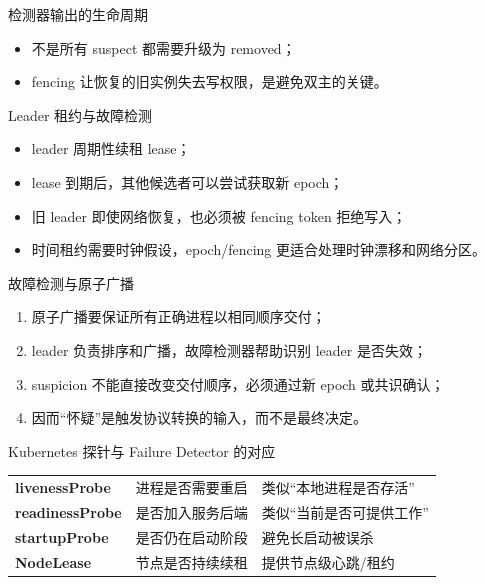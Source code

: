 \documentclass[UTF8,fontset=none,aspectratio=169,10pt]{beamer}
\begin{document}
\begin{frame}{检测器输出的生命周期}
\begin{center}
\end{center}
\begin{itemize}
  \item 不是所有 suspect 都需要升级为 removed；
  \item fencing 让恢复的旧实例失去写权限，是避免双主的关键。
\end{itemize}
\end{frame}

\begin{frame}{Leader 租约与故障检测}
\begin{itemize}
  \item leader 周期性续租 lease；
  \item lease 到期后，其他候选者可以尝试获取新 epoch；
  \item 旧 leader 即使网络恢复，也必须被 fencing token 拒绝写入；
  \item 时间租约需要时钟假设，epoch/fencing 更适合处理时钟漂移和网络分区。
\end{itemize}
\end{frame}

\begin{frame}{故障检测与原子广播}
\begin{enumerate}
  \item 原子广播要保证所有正确进程以相同顺序交付；
  \item leader 负责排序和广播，故障检测器帮助识别 leader 是否失效；
  \item suspicion 不能直接改变交付顺序，必须通过新 epoch 或共识确认；
  \item 因而“怀疑”是触发协议转换的输入，而不是最终决定。
\end{enumerate}
\end{frame}

\begin{frame}{Kubernetes 探针与 Failure Detector 的对应}
\begin{tabularx}{\linewidth}{>{\bfseries}p{3cm}XX}
\toprule
livenessProbe & 进程是否需要重启 & 类似“本地进程是否存活” \\
readinessProbe & 是否加入服务后端 & 类似“当前是否可提供工作” \\
startupProbe & 是否仍在启动阶段 & 避免长启动被误杀 \\
NodeLease & 节点是否持续续租 & 提供节点级心跳/租约 \\
\bottomrule
\end{tabularx}
\vfill
{}
\end{frame}
\end{document}
